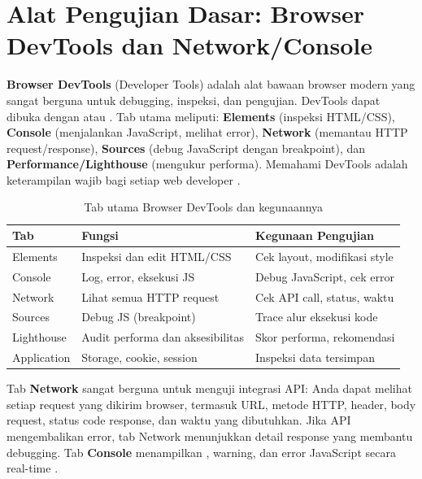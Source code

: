 ﻿\section{Alat Pengujian Dasar: Browser DevTools dan Network/Console}

\textbf{Browser DevTools} (Developer Tools) adalah alat bawaan browser modern yang sangat berguna untuk debugging, inspeksi, dan pengujian. DevTools dapat dibuka dengan  atau . Tab utama meliputi: \textbf{Elements} (inspeksi HTML/CSS), \textbf{Console} (menjalankan JavaScript, melihat error), \textbf{Network} (memantau HTTP request/response), \textbf{Sources} (debug JavaScript dengan breakpoint), dan \textbf{Performance/Lighthouse} (mengukur performa). Memahami DevTools adalah keterampilan wajib bagi setiap web developer \cite{mdnToolsTesting}.

\begin{table}[H]
\centering
\begin{tabular}{|P{2.5cm}|P{5cm}|P{5cm}|}
\hline
\textbf{Tab} & \textbf{Fungsi} & \textbf{Kegunaan Pengujian} \\
\hline
Elements & Inspeksi dan edit HTML/CSS & Cek layout, modifikasi style \\
\hline
Console & Log, error, eksekusi JS & Debug JavaScript, cek error \\
\hline
Network & Lihat semua HTTP request & Cek API call, status, waktu \\
\hline
Sources & Debug JS (breakpoint) & Trace alur eksekusi kode \\
\hline
Lighthouse & Audit performa dan aksesibilitas & Skor performa, rekomendasi \\
\hline
Application & Storage, cookie, session & Inspeksi data tersimpan \\
\hline
\end{tabular}
\caption{Tab utama Browser DevTools dan kegunaannya}
\end{table}

Tab \textbf{Network} sangat berguna untuk menguji integrasi API: Anda dapat melihat setiap request yang dikirim browser, termasuk URL, metode HTTP, header, body request, status code response, dan waktu yang dibutuhkan. Jika API mengembalikan error, tab Network menunjukkan detail response yang membantu debugging. Tab \textbf{Console} menampilkan , warning, dan error JavaScript secara real-time \cite{mdnToolsTesting}.

